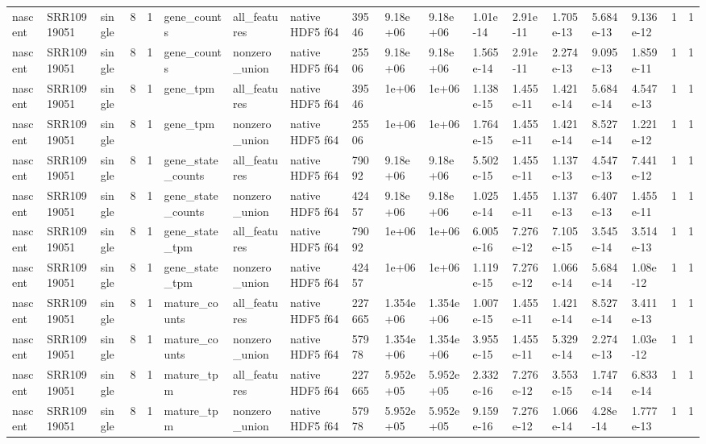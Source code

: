 \begin{tabular}{llllllllllllllllll}
nascent & SRR10919051 & single & 8 & 1 & gene\_counts & all\_features & native HDF5 f64 & 39546 & 9.18e+06 & 9.18e+06 & 1.01e-14 & 2.91e-11 & 1.705e-13 & 5.684e-13 & 9.136e-12 & 1 & 1 \\
nascent & SRR10919051 & single & 8 & 1 & gene\_counts & nonzero\_union & native HDF5 f64 & 25506 & 9.18e+06 & 9.18e+06 & 1.565e-14 & 2.91e-11 & 2.274e-13 & 9.095e-13 & 1.859e-11 & 1 & 1 \\
nascent & SRR10919051 & single & 8 & 1 & gene\_tpm & all\_features & native HDF5 f64 & 39546 & 1e+06 & 1e+06 & 1.138e-15 & 1.455e-11 & 1.421e-14 & 5.684e-14 & 4.547e-13 & 1 & 1 \\
nascent & SRR10919051 & single & 8 & 1 & gene\_tpm & nonzero\_union & native HDF5 f64 & 25506 & 1e+06 & 1e+06 & 1.764e-15 & 1.455e-11 & 1.421e-14 & 8.527e-14 & 1.221e-12 & 1 & 1 \\
nascent & SRR10919051 & single & 8 & 1 & gene\_state\_counts & all\_features & native HDF5 f64 & 79092 & 9.18e+06 & 9.18e+06 & 5.502e-15 & 1.455e-11 & 1.137e-13 & 4.547e-13 & 7.441e-12 & 1 & 1 \\
nascent & SRR10919051 & single & 8 & 1 & gene\_state\_counts & nonzero\_union & native HDF5 f64 & 42457 & 9.18e+06 & 9.18e+06 & 1.025e-14 & 1.455e-11 & 1.137e-13 & 6.407e-13 & 1.455e-11 & 1 & 1 \\
nascent & SRR10919051 & single & 8 & 1 & gene\_state\_tpm & all\_features & native HDF5 f64 & 79092 & 1e+06 & 1e+06 & 6.005e-16 & 7.276e-12 & 7.105e-15 & 3.545e-14 & 3.514e-13 & 1 & 1 \\
nascent & SRR10919051 & single & 8 & 1 & gene\_state\_tpm & nonzero\_union & native HDF5 f64 & 42457 & 1e+06 & 1e+06 & 1.119e-15 & 7.276e-12 & 1.066e-14 & 5.684e-14 & 1.08e-12 & 1 & 1 \\
nascent & SRR10919051 & single & 8 & 1 & mature\_counts & all\_features & native HDF5 f64 & 227665 & 1.354e+06 & 1.354e+06 & 1.007e-15 & 1.455e-11 & 1.421e-14 & 8.527e-14 & 3.411e-13 & 1 & 1 \\
nascent & SRR10919051 & single & 8 & 1 & mature\_counts & nonzero\_union & native HDF5 f64 & 57978 & 1.354e+06 & 1.354e+06 & 3.955e-15 & 1.455e-11 & 5.329e-14 & 2.274e-13 & 1.03e-12 & 1 & 1 \\
nascent & SRR10919051 & single & 8 & 1 & mature\_tpm & all\_features & native HDF5 f64 & 227665 & 5.952e+05 & 5.952e+05 & 2.332e-16 & 7.276e-12 & 3.553e-15 & 1.747e-14 & 6.833e-14 & 1 & 1 \\
nascent & SRR10919051 & single & 8 & 1 & mature\_tpm & nonzero\_union & native HDF5 f64 & 57978 & 5.952e+05 & 5.952e+05 & 9.159e-16 & 7.276e-12 & 1.066e-14 & 4.28e-14 & 1.777e-13 & 1 & 1 \\

\end{tabular}

